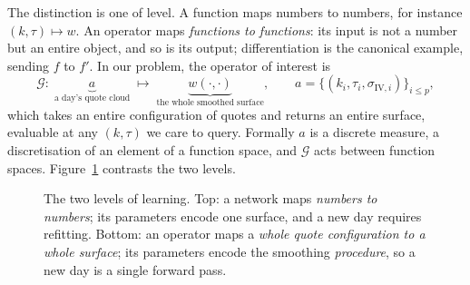 The distinction is one of level. A function maps numbers to numbers, for instance
$(k,\tau)\mapsto w$. An operator maps \emph{functions to functions}: its input is not a number
but an entire object, and so is its output; differentiation is the canonical example, sending $f$
to $f'$. In our problem, the operator of interest is
\begin{equation}\label{eq:opmap}
\mathcal G:\;\underbrace{a}_{\text{a day's quote cloud}}\;\longmapsto\;
\underbrace{w(\cdot,\cdot)}_{\text{the whole smoothed surface}},
\qquad
a=\bigl\{(k_i,\tau_i,\sigma_{\mathrm{IV},i})\bigr\}_{i\le p},
\end{equation}
which takes an entire configuration of quotes and returns an entire surface, evaluable at any
$(k,\tau)$ we care to query. Formally $a$ is a discrete measure, a discretisation of an element
of a function space, and $\mathcal G$ acts between function spaces. Figure~\ref{fig:funcvsop}
contrasts the two levels.

\begin{figure}[htbp]\centering
{}
\caption{The two levels of learning. Top: a network maps \emph{numbers to numbers}; its
parameters encode one surface, and a new day requires refitting. Bottom: an operator maps a
\emph{whole quote configuration to a whole surface}; its parameters encode the smoothing
\emph{procedure}, so a new day is a single forward pass.}\label{fig:funcvsop}
\end{figure}

